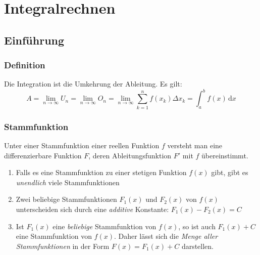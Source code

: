 \chapter{Integralrechnen}

\section{Einführung} %
\label{sec:einführung}

\subsection{Definition} %
\label{sub:definition}
Die Integration ist die Umkehrung der Ableitung.
Es gilt:
\[A = \lim\limits_{n \rightarrow \infty}U_n = \lim\limits_{n \rightarrow \infty}O_n = \lim\limits_{n \rightarrow \infty}\sum_{k=1}^{n} f(x_k) \Delta x_k = \int_a^b f(x)\,\mathrm{d}x \]
\subsection{Stammfunktion} %
\begin{definition}
Unter einer Stammfunktion einer reellen Funktion $f$ versteht man eine differenzierbare Funktion $F$, deren Ableitungsfunktion $F'$ mit $f$ übereinstimmt.


\begin{enumerate}
	\item Falls es eine Stammfunktion zu einer stetigen Funktion \(f(x)\) gibt, gibt es \emph{unendlich} viele Stammfunktionen
	\item Zwei beliebige Stammfunktionen \(F_1 (x)\) und \(F_2 (x)\) von \(f(x)\) unterscheiden sich durch eine \emph{additive} Konstante: \(F_1 (x) - F_2 (x) = C\)
	\item Ist \(F_1 (x)\) eine \emph{beliebige} Stammfunktion von \(f (x)\), so ist auch \(F_1 (x) + C\) eine Stammfunktion von \(f (x)\). Daher lässt sich die \emph{Menge aller Stammfunktionen} in der Form \(F(x) = F_1 (x) + C \) darstellen.
\end{enumerate}
\end{definition}



